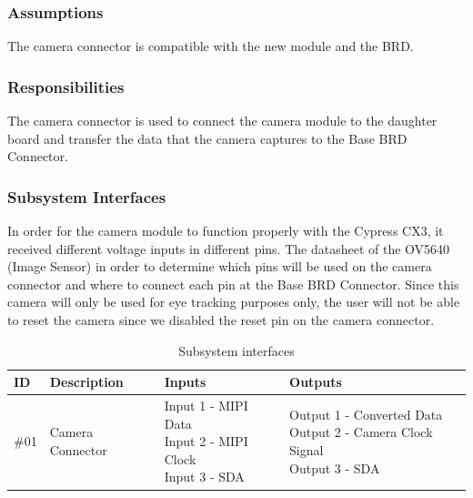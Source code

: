 \subsubsection{Assumptions}
The camera connector is compatible with the new module and the BRD.

\subsubsection{Responsibilities}
The camera connector is used to connect the camera module to the daughter board and transfer the data that the camera captures to the Base BRD Connector.

\subsubsection{Subsystem Interfaces}
In order for the camera module to function properly with the Cypress CX3, it received different voltage inputs in different pins. The datasheet of the OV5640 (Image Sensor) in order to determine which pins will be used on the camera connector and where to connect each pin at the Base BRD Connector. Since this camera will only be used for eye tracking purposes only, the user will not be able to reset the camera since we disabled the reset pin on the camera connector.

\begin {table}[H]
\caption {Subsystem interfaces}
\begin{center}
    \begin{tabular}{ | p{1cm} | p{6cm} | p{3cm} | p{3cm} |}
    \hline
    ID & Description & Inputs & Outputs \\ \hline
    \#01 & Camera Connector & \pbox{3cm}{Input 1 - MIPI Data \\ Input 2 - MIPI Clock \\ Input 3 - SDA} & \pbox{3cm}{Output 1 - Converted Data \\ Output 2 - Camera Clock Signal \\ Output 3 - SDA}  \\ \hline
    \end{tabular}
\end{center}
\end{table}
